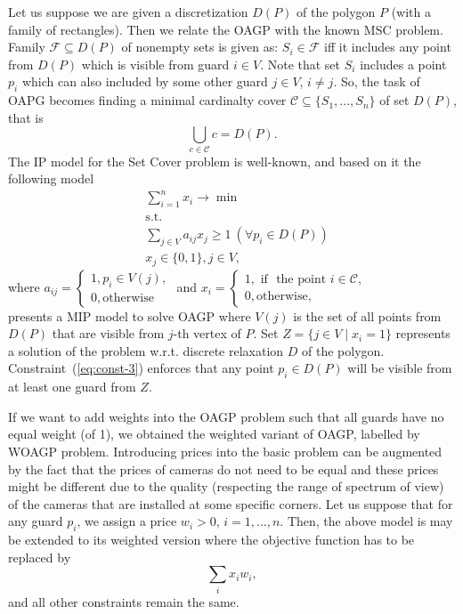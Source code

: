 \documentclass[runningheads,a4paper]{elsarticle}
\begin{document}
     Let us suppose we are given a discretization $D(P)$ of the polygon $P$ (with a family of rectangles). Then we relate the OAGP with the known MSC problem.
     Family $\mathcal{F}\subseteq D(P)$ of nonempty sets is given as: $S_i \in \mathcal{F}$ iff it includes any point from $D(P)$ which is visible from guard $i\in V$. Note that set $S_i$ includes a point $p_i$ which can also included by some other guard $j\in V$, $i \neq j$. So, the task of OAPG becomes finding a minimal cardinalty cover $\mathcal{C}\subseteq\{S_1,...,S_n\}$ of set $D(P)$, that is
     $$ \bigcup_{c \in \mathcal{C}} c = D(P).$$ The IP  model for the Set Cover problem is well-known, and based on it the following model
     \begin{align}
        &\sum_{i=1}^n x_i \longrightarrow \min \\
        &\mbox{s.t.} \\
        &\sum_{j\in V} a_{ij}x_j \geq 1\ (\forall p_i\in D(P)) \label{eq:const-3}\\
        & x_j \in \{0,1\}, j \in V,
     \end{align}
     where
     $a_{ij} = \begin{cases}
          1, p_i \in V(j), \\
          0, \mbox{otherwise}
     \end{cases}$
     and $x_i = \begin{cases}
     	 1, \mbox{ if } \mbox{ the point } i \in \mathcal{C},\\
     	 0, \mbox{otherwise},
     \end{cases}$ \\
      presents a MIP model to solve OAGP where $V(j)$ is the set of all points from $D(P)$ that are visible from $j$-th vertex of $P$.
     Set $Z = \{j \in V\mid x_i=1\}$ represents a solution of the problem w.r.t. discrete relaxation $D$ of the polygon.
     Constraint~(\ref{eq:const-3}) enforces that any point $p_i \in D(P)$ will be visible from at least one guard from $Z$.

     If we want to add weights into the OAGP problem such that all guards have no equal weight (of 1), we obtained the weighted variant of OAGP, labelled by WOAGP problem. Introducing prices into the basic problem can be augmented by the fact that the prices of cameras do not need to be equal and these prices might be different due to the quality (respecting the range of spectrum of view) of the cameras that are installed at some specific corners.  Let us suppose that for any guard $p_i$, we assign a price $w_i>0$, $i=1,...,n$. Then, the above model is may be extended to its weighted version where the objective function has to be replaced by
     $$ \sum_{i} x_i w_i,$$
      and all other constraints remain the same.
\end{document}
